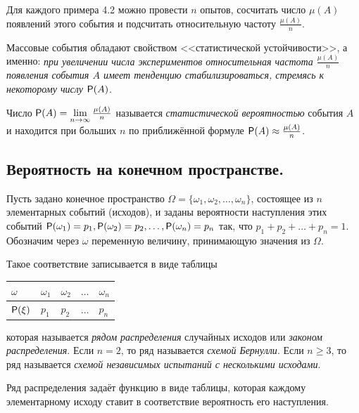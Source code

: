 Для каждого примера 4.2 можно провести $n$ опытов, сосчитать число $\mu(A)$ появлений этого события и подсчитать относительную частоту $\frac{\mu(A)}{n}$.

Массовые события обладают свойством <<статистической устойчивости>>, а именно: \textit{при увеличении числа экспериментов относительная частота $\frac{\mu(A)}{n}$
появления события $A$ имеет тенденцию стабилизироваться, стремясь к некоторому числу $\P(A)$.}
\begin{definition}
	\label{def:4.4}
Число $\P(A) = \lim\limits_{n\to\infty} \frac{\mu(A)}{n}$ называется \textit{статистической вероятностью} события $A$ и находится при больших $n$ по приближённой формуле $\P(A)\approx \frac{\mu(A)}{n}$.
\end{definition} 

\subsection{Вероятность на конечном пространстве.}
\label{par:4.2}
Пусть задано конечное пространство $\Omega=\{\omega_1,\omega_2,\ldots,\omega_n\}$, состоящее из $n$ элементарных событий (исходов), и заданы вероятности наступления этих
событий $\P(\omega_1 ) = p_1 , \P(\omega_2 ) = p_2 , \ldots , \P(\omega_n ) = p_n$ так, что $p_1 + p_2 + \ldots + p_n = 1$.
Обозначим через $\omega$ переменную величину, принимающую значения из $\Omega$.

\begin{definition}
	\label{def:4.5}
Такое соответствие записывается в виде таблицы
\begin{center}
	\begin{tabular}{|l|l|l|l|l|}
		\hline
		$\omega$ & $\omega_1$ & $\omega_2$ & $\ldots$ & $\omega_n$ \\ \hline
		$\P(\xi)$  & $p_1$ & $p_2$ & $\ldots$  & $p_n$ \\ \hline
	\end{tabular}
\end{center}


которая называется \textit{рядом распределения} случайных исходов или \textit{законом
распределения}. Если $n = 2$, то ряд называется \textit{схемой Бернулли}. Если $n \geq 3$,
то ряд называется \textit{схемой независимых испытаний с несколькими исходами}.
\end{definition}

Ряд распределения задаёт функцию в виде таблицы, которая каждому элементарному исходу ставит в соответствие вероятность его наступления.

